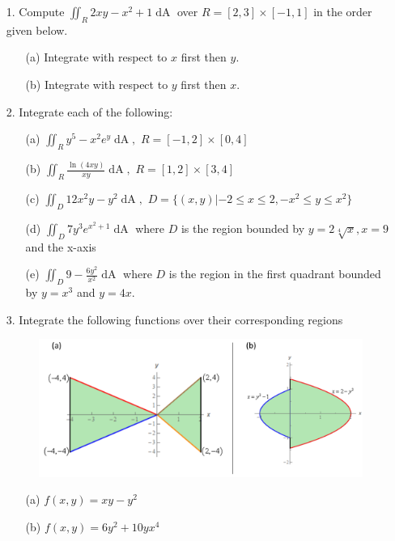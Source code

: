 \documentclass[12pt, amssymb, one column]{article}
\begin{document}
\begin{itemize}
	\item[1.] Compute $\iint_R 2xy-x^2+1 \mathop{dA} $ over $R=[2,3] \times [-1,1]$ in the order given below.
	\begin{itemize}
		\item[(a)] Integrate with respect to $x$ first then $y$.
		\item[(b)] Integrate with respect to $y$ first then $x$.
	\end{itemize}
	
	\item[2.] Integrate each of the following:
		\begin{itemize}
			\item[(a)] $\iint_R y^5-x^2e^y \mathop{dA}, \,\, R=[-1,2] \times [0,4]$
			\item[(b)] $\iint_R \frac{\ln(4xy)}{xy} \mathop{dA}, \,\, R=[1,2]\times[3,4]$
			\item[(c)] $\iint_D 12x^2y-y^2 \mathop{dA}, \,\, D=\{(x,y)|-2\leq x \leq 2, -x^2 \leq y \leq x^2\}$
			\item[(d)] $\iint_D 7y^3e^{x^2+1} \mathop{dA}$ where $D$ is the region bounded by $y=2\sqrt[4]{x},x=9$ and the x-axis
			\item[(e)] $\iint_D 9-\frac{6y^2}{x^2} \mathop{dA}$ where $D$ is the region in the first quadrant bounded by $y=x^3$ and $y=4x$.
		\end{itemize}
	
	\item[3.] Integrate the following functions over their corresponding regions
	\begin{figure}[h]
		\centering
		\includegraphics[width=.8\textwidth]{regions.png}\\
	\end{figure}
		\begin{itemize}
			\item[(a)] $f(x,y) = xy-y^2$
			\item[(b)] $f(x,y) = 6y^2 + 10yx^4$
		\end{itemize}
	

\end{itemize}
\end{document}
